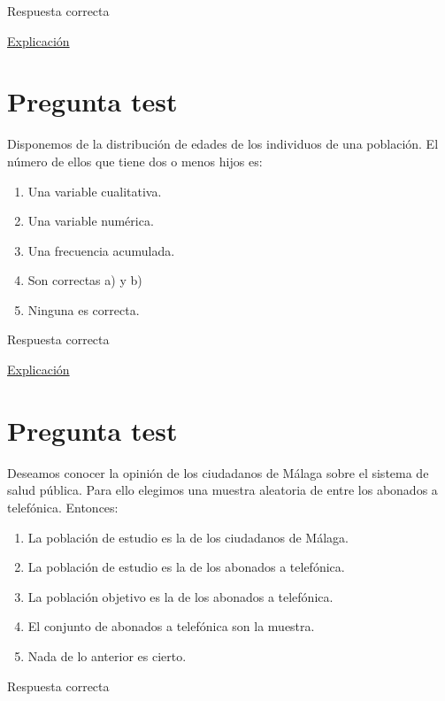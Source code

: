 \documentclass[
]{book}
\providecommand{\tightlist}{%
  \setlength{\itemsep}{0pt}\setlength{\parskip}{0pt}}
\begin{document}
Respuesta correcta

\href{https://es.wikipedia.org/wiki/Estudio_de_cohorte}{Explicación}

\hypertarget{pregunta-test-36}{%
\section{Pregunta test}\label{pregunta-test-36}}

Disponemos de la distribución de edades de los individuos de una población. El número de ellos que tiene dos o menos hijos es:

\begin{enumerate}
\def\labelenumi{\alph{enumi})}
\tightlist
\item
  Una variable cualitativa.
\item
  Una variable numérica.
\item
  Una frecuencia acumulada.
\item
  Son correctas a) y b)
\item
  Ninguna es correcta.
\end{enumerate}

Respuesta correcta

\href{https://1fjmanzano.github.io/bioestadistica/tablas-de-frecuencias.html}{Explicación}

\hypertarget{pregunta-test-37}{%
\section{Pregunta test}\label{pregunta-test-37}}

Deseamos conocer la opinión de los ciudadanos de Málaga sobre el sistema de salud pública. Para ello elegimos una muestra aleatoria de entre los abonados a telefónica. Entonces:

\begin{enumerate}
\def\labelenumi{\alph{enumi})}
\tightlist
\item
  La población de estudio es la de los ciudadanos de Málaga.
\item
  La población de estudio es la de los abonados a telefónica.
\item
  La población objetivo es la de los abonados a telefónica.
\item
  El conjunto de abonados a telefónica son la muestra.
\item
  Nada de lo anterior es cierto.
\end{enumerate}

Respuesta correcta
\end{document}
